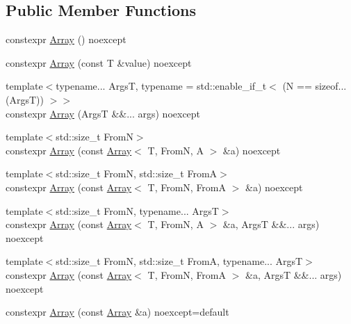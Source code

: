 \subsection*{Public Member Functions}
\begin{DoxyCompactItemize}
\item 
constexpr \mbox{\hyperlink{structmage_1_1_array_ac1cf5733c005dfb79fb9e5e736098598}{Array}} () noexcept
\item 
constexpr \mbox{\hyperlink{structmage_1_1_array_a1f206f942c1318eb7f57c7e0666bc923}{Array}} (const T \&value) noexcept
\item 
{\footnotesize template$<$typename... ArgsT, typename  = std\+::enable\+\_\+if\+\_\+t$<$ (\+N == sizeof...(\+Args\+T)) $>$$>$ }\\constexpr \mbox{\hyperlink{structmage_1_1_array_ab6dbce28b41b7ef1e9c0195f24f378a6}{Array}} (ArgsT \&\&... args) noexcept
\item 
{\footnotesize template$<$std\+::size\+\_\+t FromN$>$ }\\constexpr \mbox{\hyperlink{structmage_1_1_array_a1e0a4b5cebb34709b32bc13e9ab917e1}{Array}} (const \mbox{\hyperlink{structmage_1_1_array}{Array}}$<$ T, FromN, A $>$ \&a) noexcept
\item 
{\footnotesize template$<$std\+::size\+\_\+t FromN, std\+::size\+\_\+t FromA$>$ }\\constexpr \mbox{\hyperlink{structmage_1_1_array_ac747c6b1fad2e919e3370cbe6b2937f5}{Array}} (const \mbox{\hyperlink{structmage_1_1_array}{Array}}$<$ T, FromN, FromA $>$ \&a) noexcept
\item 
{\footnotesize template$<$std\+::size\+\_\+t FromN, typename... ArgsT$>$ }\\constexpr \mbox{\hyperlink{structmage_1_1_array_a128de416259f75f7b4ab8ab2e1ba9bd7}{Array}} (const \mbox{\hyperlink{structmage_1_1_array}{Array}}$<$ T, FromN, A $>$ \&a, ArgsT \&\&... args) noexcept
\item 
{\footnotesize template$<$std\+::size\+\_\+t FromN, std\+::size\+\_\+t FromA, typename... ArgsT$>$ }\\constexpr \mbox{\hyperlink{structmage_1_1_array_a4952f767cdedb8c2874391dc4d9b74c3}{Array}} (const \mbox{\hyperlink{structmage_1_1_array}{Array}}$<$ T, FromN, FromA $>$ \&a, ArgsT \&\&... args) noexcept
\item 
constexpr \mbox{\hyperlink{structmage_1_1_array_a8dc58948e15554f715b280a72140a1f4}{Array}} (const \mbox{\hyperlink{structmage_1_1_array}{Array}} \&a) noexcept=default
\item 

\end{DoxyCompactItemize}
